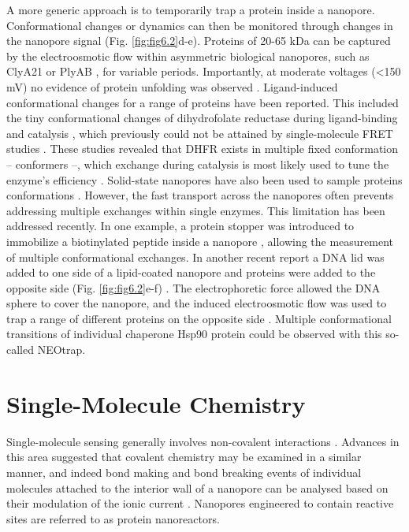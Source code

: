 A more generic approach is to temporarily trap a protein inside a nanopore. Conformational changes or dynamics can then be monitored through changes in the nanopore signal (Fig. \ref{fig:fig6.2}d-e). Proteins of 20-65 kDa can be captured by the electroosmotic flow within asymmetric biological nanopores, such as ClyA21 or PlyAB \cite{Huang2020a}, for variable periods. Importantly, at moderate voltages (<150 mV) no evidence of protein unfolding was observed \cite{Zernia2020}. Ligand-induced conformational changes for a range of proteins \cite{Galenkamp2020,VanMeervelt2017} have been reported. This included the tiny conformational changes of dihydrofolate reductase during ligand-binding \cite{Galenkamp2020} and catalysis \cite{Galenkamp2020b}, which previously could not be attained by single-molecule FRET studies \cite{Rajagopalan2002}. These studies revealed that DHFR exists in multiple fixed conformation – conformers –, which exchange during catalysis is most likely used to tune the enzyme’s efficiency \cite{Galenkamp2020,Galenkamp2020b}. Solid-state nanopores have also been used to sample proteins conformations \cite{Waduge2017}. However, the fast transport across the nanopores often prevents addressing multiple exchanges within single enzymes. This limitation has been addressed recently. In one example, a protein stopper was introduced to immobilize a biotinylated peptide inside a nanopore \cite{Liu2021}, allowing the measurement of multiple conformational exchanges. In another recent report a DNA lid was added to one side of a lipid-coated nanopore and proteins were added to the opposite side (Fig. \ref{fig:fig6.2}e-f) \cite{Schmid2021a}. The electrophoretic force allowed the DNA sphere to cover the nanopore, and the induced electroosmotic flow was used to trap a range of different proteins on the opposite side \cite{Schmid2021a}. Multiple conformational transitions of individual chaperone Hsp90 protein could be observed with this so-called NEOtrap.


\section{Single-Molecule Chemistry}
Single-molecule sensing generally involves non-covalent interactions \cite{Bayley2001}. Advances in this area suggested that covalent chemistry may be examined in a similar manner, and indeed bond making and bond breaking events of individual molecules attached to the interior wall of a nanopore can be analysed based on their modulation of the ionic current \cite{Bayley2008a}. Nanopores engineered to contain reactive sites are referred to as protein nanoreactors.


